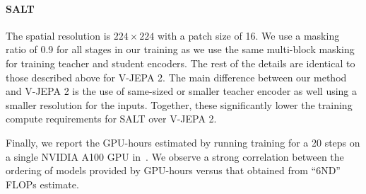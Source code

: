 \documentclass{applemlr}
\numberwithin{equation}{section}
\newcommand{\ourmethod}{SALT\xspace}
\begin{document}
\paragraph{\ourmethod} The spatial resolution is $224 \times 224$ with a patch size of 16. We use a masking ratio of 0.9 for all stages in our training as we use the same multi-block masking for training teacher and student encoders. The rest of the details are identical to those described above for V-JEPA 2. The main difference between our method and V-JEPA 2 is the use of same-sized or smaller teacher encoder as well using a smaller resolution for the inputs. Together, these significantly lower the training compute requirements for \ourmethod over V-JEPA 2.

Finally, we report the GPU-hours estimated by running training for a 20 steps on a single NVIDIA A100 GPU in~. We observe a strong correlation between the ordering of models provided by GPU-hours versus that obtained from ``6ND'' FLOPs estimate.

\begin{table}[htbp]
\centering
\caption{FLOPs estimate for VideoMAEv2, V-JEPA 2 and \ourmethod models.}
\label{tab:appendix:model_flops}
\end{table}
\end{document}
